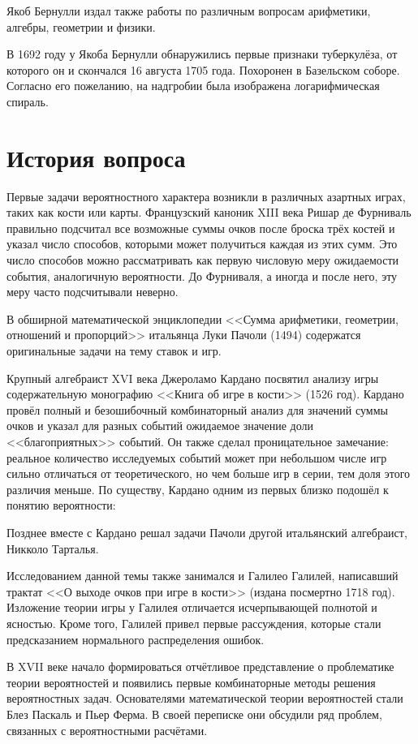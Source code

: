 \documentclass[12pt]{article}
\begin{document}
Якоб Бернулли издал также работы по различным вопросам арифметики, алгебры, геометрии и физики. 

В 1692 году у Якоба Бернулли обнаружились первые признаки туберкулёза, от которого он и скончался 16 августа 1705 года. Похоронен в Базельском соборе. Согласно его пожеланию, на надгробии была изображена логарифмическая спираль.

\newpage
\section{История вопроса}
Первые задачи вероятностного характера возникли в различных азартных играх, таких как кости или карты.
Французский каноник XIII века Ришар де Фурниваль правильно подсчитал все возможные суммы очков после броска трёх костей и указал число способов, которыми может получиться каждая из этих сумм. 
Это число способов можно рассматривать как первую числовую меру ожидаемости события, аналогичную вероятности.
До Фурниваля, а иногда и после него, эту меру часто подсчитывали неверно.

В обширной математической энциклопедии <<Сумма арифметики, геометрии, отношений и пропорций>> итальянца Луки Пачоли (1494) содержатся оригинальные задачи на тему ставок и игр.

Крупный алгебраист XVI века Джероламо Кардано посвятил анализу игры содержательную монографию <<Книга об игре в кости>> (1526 год).
Кардано провёл полный и безошибочный комбинаторный анализ для значений суммы очков и указал для разных событий ожидаемое значение доли <<благоприятных>> событий. Он также сделал проницательное замечание: реальное количество исследуемых событий может при небольшом числе игр сильно отличаться от теоретического, но чем больше игр в серии, тем доля этого различия меньше. 
По существу, Кардано одним из первых близко подошёл к понятию вероятности:

Позднее вместе с Кардано решал задачи Пачоли другой итальянский алгебраист, Никколо Тарталья.

Исследованием данной темы также занимался и Галилео Галилей, написавший трактат <<О выходе очков при игре в кости>> (издана посмертно 1718 год).
Изложение теории игры у Галилея отличается исчерпывающей полнотой и ясностью. 
Кроме того, Галилей привел первые рассуждения, которые стали предсказанием нормального распределения ошибок.

В XVII веке начало формироваться отчётливое представление о проблематике теории вероятностей и появились первые комбинаторные методы решения вероятностных задач. 
Основателями математической теории вероятностей стали Блез Паскаль и Пьер Ферма.
В своей переписке они обсудили ряд проблем, связанных с вероятностными расчётами.
\end{document}
